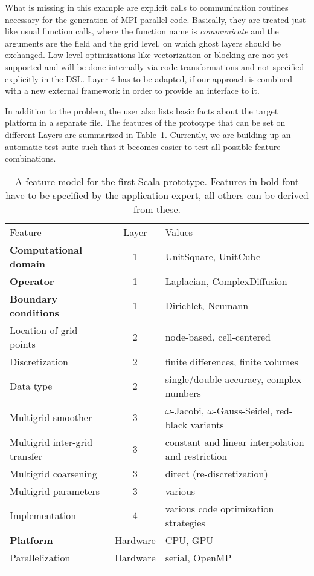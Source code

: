 \documentclass[onecolumn]{svjour3}
\begin{document}
What is missing in this example are explicit calls to communication routines necessary for the generation of MPI-parallel code. Basically, they are treated just like usual function calls, where the function name is \textit{communicate} and the arguments are the field and the grid level, on which ghost layers should be exchanged. Low level optimizations like vectorization or blocking are not yet supported and will be done internally via code transformations and not specified explicitly in the DSL. Layer 4 has to be adapted, if our approach is combined with a new external framework in order to provide an interface to it. 





In addition to the problem, the user also lists basic facts about the target platform in a separate file.
The features of the prototype that can be set on different Layers are summarized in Table~\ref{tab:generator}. Currently, we are building up an automatic test suite such that it becomes easier to test all possible feature combinations. 

 \begin{table}
\centering
\caption{\label{tab:generator} A feature model for the first Scala prototype. Features in bold font have to be specified by the application expert, all others can be derived from these. } \begin{tabular}{lcl}
\toprule\noalign{\smallskip}
 Feature & Layer & Values   \\   
\noalign{\smallskip}\midrule\noalign{\smallskip}
\textbf{Computational domain} & 1 &  UnitSquare, UnitCube  \\
\textbf{Operator} & 1 &  Laplacian, ComplexDiffusion \\
\textbf{Boundary conditions} & 1 &  Dirichlet, Neumann  \\
Location of grid points & 2 &  node-based, cell-centered  \\
Discretization & 2 &  finite differences, finite volumes  \\
Data type & 2 &  single/double accuracy, complex numbers  \\
Multigrid smoother & 3 &  $\omega$-Jacobi, $\omega$-Gauss-Seidel, red-black variants  \\
Multigrid inter-grid transfer & 3 &  constant and linear interpolation and restriction  \\
Multigrid coarsening & 3 &  direct (re-discretization)  \\
Multigrid parameters & 3 &  various  \\
Implementation & 4 &  various code optimization strategies \\ \textbf{Platform} & Hardware &  CPU, GPU  \\
Parallelization & Hardware &  serial, OpenMP \\
\noalign{\smallskip}\bottomrule
\end{tabular} 
\end{table}
\end{document}
